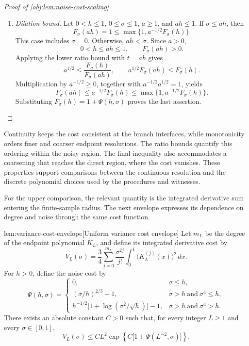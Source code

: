 \documentclass[11pt]{article}
\begin{document}
\begin{proof}[Proof of \cref{obj:lem:noise-cost-scaling}]
\begin{enumerate}
\item \emph{Dilation bound.}
Let \(0<h\le1\), \(0\le\sigma\le1\), \(a\ge1\), and \(ah\le1\). If \(\sigma\le ah\), then
\[
F_\sigma(ah)=1
\le\max\{1,a^{-1/2}F_\sigma(h)\}.
\]
This case includes \(\sigma=0\). Otherwise, \(ah<\sigma\). Since \(a>0\),
\[
0<h\le ah\le1,\qquad F_\sigma(ah)>0.
\]
Applying the lower ratio bound with \(t=ah\) gives
\[
a^{1/2}
\le\frac{F_\sigma(h)}{F_\sigma(ah)},
\qquad
a^{1/2}F_\sigma(ah)\le F_\sigma(h).
\]
Multiplication by \(a^{-1/2}\ge0\), together with
\(a^{-1/2}a^{1/2}=1\), yields
\[
F_\sigma(ah)
\le a^{-1/2}F_\sigma(h)
\le\max\{1,a^{-1/2}F_\sigma(h)\}.
\]
Substituting \(F_\sigma(h)=1+\Psi(h,\sigma)\) proves the last assertion.
\end{enumerate}
\end{proof}

Continuity keeps the cost consistent at the branch interfaces, while monotonicity orders finer and coarser endpoint resolutions. The ratio bounds quantify this ordering within the noisy region. The final inequality also accommodates a coarsening that reaches the direct region, where the cost vanishes. These properties support comparisons between the continuous resolution and the discrete polynomial choices used by the procedures and witnesses.

For the upper comparison, the relevant quantity is the integrated derivative sum entering the finite-sample radius. The next envelope expresses its dependence on degree and noise through the same cost function.

\begin{lemmav}{lem:variance-cost-envelope}[Uniform variance cost envelope]
Let \(m_L\) be the degree of the endpoint polynomial \(K_L\), and define its integrated derivative cost by
\[
V_L(\sigma)
=\frac34\sum_{j=0}^{m_L}\frac{\sigma^{2j}}{j!}
\int_0^1\bigl(K_L^{(j)}(x)\bigr)^2\,dx.
\]
For \(h>0\), define the noise cost by
\[
\Psi(h,\sigma)=
\begin{cases}
0, & \sigma\le h,\\
(\sigma/h)^{2/3}-1, & \sigma>h\ \text{and}\ \sigma^4\le h,\\
h^{-1/2}\bigl[1+\log(\sigma^2/\sqrt h)\bigr]-1,
& \sigma>h\ \text{and}\ \sigma^4>h.
\end{cases}
\]
There exists an absolute constant \(C>0\) such that, for every integer \(L\ge1\) and every \(\sigma\in[0,1]\),
\[
V_L(\sigma)\le C L^2
\exp\!\left\{C\bigl[1+\Psi(L^{-2},\sigma)\bigr]\right\}.
\]
\end{lemmav}
\end{document}
